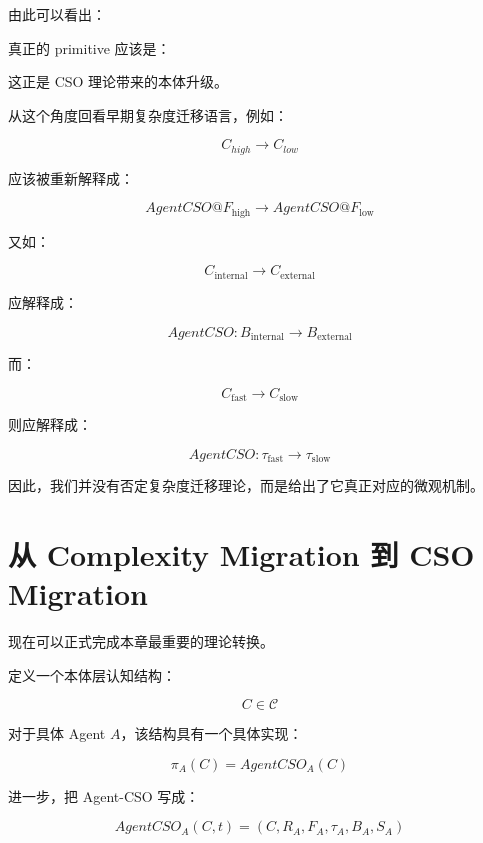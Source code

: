 由此可以看出：

\begin{statementbox}
\centering
{}
\end{statementbox}

真正的 primitive 应该是：

\begin{statementbox}
\centering
{}
\end{statementbox}

这正是 CSO 理论带来的本体升级。

从这个角度回看早期复杂度迁移语言，例如：

\[
C_{high}\rightarrow C_{low}
\]

应该被重新解释成：

\[
AgentCSO@F_{\mathrm{high}}
\rightarrow
AgentCSO@F_{\mathrm{low}}
\]

又如：

\[
C_{\mathrm{internal}}
\rightarrow
C_{\mathrm{external}}
\]

应解释成：

\[
AgentCSO:
B_{\mathrm{internal}}
\rightarrow
B_{\mathrm{external}}
\]

而：

\[
C_{\mathrm{fast}}
\rightarrow
C_{\mathrm{slow}}
\]

则应解释成：

\[
AgentCSO:
\tau_{\mathrm{fast}}
\rightarrow
\tau_{\mathrm{slow}}
\]

因此，我们并没有否定复杂度迁移理论，而是给出了它真正对应的微观机制。

\section{从 Complexity Migration 到 CSO Migration}
\label{sec:complexity-to-cso}

现在可以正式完成本章最重要的理论转换。

定义一个本体层认知结构：

\[
C\in\mathcal C
\]

对于具体 Agent $A$，该结构具有一个具体实现：

\[
\pi_A(C)
=
AgentCSO_A(C)
\]

进一步，把 Agent-CSO 写成：

\[
\boxed{
AgentCSO_A(C,t)
=
\left(
C,
R_A,
F_A,
\tau_A,
B_A,
S_A
\right)
}
\]

